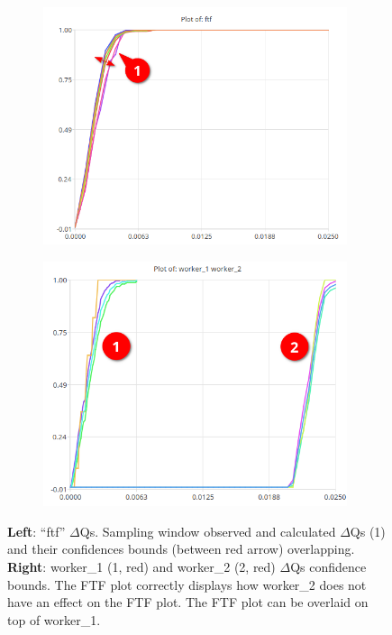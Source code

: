             \begin{figure}[H]
                \centering 
                \begin{subfigure}{.5\textwidth}
                    \centering
                    \includegraphics[width =0.98\textwidth]{img/ftfa.png}
                    \label{fig:ftf_art_d}
                \end{subfigure}%
                \begin{subfigure}{.5\textwidth}%
                    \centering%
                    \includegraphics[width =0.98\textwidth]{img/delay32.png}%
                    \label{fig:ftf_art_dw}%
                \end{subfigure}%
                \caption{\textbf{Left}: ``ftf'' $\Delta$Qs. Sampling window observed and calculated $\Delta$Qs (1) and their confidences bounds (between red arrow) overlapping.
                \textbf{Right}: worker\_1 (1, red) and worker\_2 (2, red) $\Delta$Qs confidence bounds.
                The FTF plot correctly displays how worker\_2 does not have an effect on the FTF plot. The FTF plot can be overlaid on top of worker\_1.}
                \label{fig:ftf_w1w2}%
            \end{figure}%

